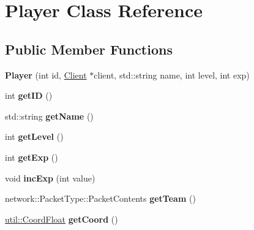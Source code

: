\hypertarget{class_player}{\section{Player Class Reference}
\label{class_player}
}
\subsection*{Public Member Functions}
\begin{DoxyCompactItemize}
\item 
\hypertarget{class_player_aa4859027be34e4fa0f8c05b6be3c22e3}{{\bfseries Player} (int id, \hyperlink{class_client}{Client} $\ast$client, std\-::string name, int level, int exp)}\label{class_player_aa4859027be34e4fa0f8c05b6be3c22e3}

\item 
\hypertarget{class_player_aab4c2c78be24a52f5faeb29e4c04e5f5}{int {\bfseries get\-I\-D} ()}\label{class_player_aab4c2c78be24a52f5faeb29e4c04e5f5}

\item 
\hypertarget{class_player_af1aa472885d589516f483e26e786600e}{std\-::string {\bfseries get\-Name} ()}\label{class_player_af1aa472885d589516f483e26e786600e}

\item 
\hypertarget{class_player_a10dad3b41b420fcc88e83370d981d35b}{int {\bfseries get\-Level} ()}\label{class_player_a10dad3b41b420fcc88e83370d981d35b}

\item 
\hypertarget{class_player_adb81d4193787e61fd964543c1234fba6}{int {\bfseries get\-Exp} ()}\label{class_player_adb81d4193787e61fd964543c1234fba6}

\item 
\hypertarget{class_player_a8bbc7a52991de5e561ff51b77fc26c2f}{void {\bfseries inc\-Exp} (int value)}\label{class_player_a8bbc7a52991de5e561ff51b77fc26c2f}

\item 
\hypertarget{class_player_adeecff9c72be7a3a60af19878cb5e4e8}{network\-::\-Packet\-Type\-::\-Packet\-Contents {\bfseries get\-Team} ()}\label{class_player_adeecff9c72be7a3a60af19878cb5e4e8}

\item 
\hypertarget{class_player_a03fa002bb1981917e81356486b9102aa}{\hyperlink{classutil_1_1_coordinates}{util\-::\-Coord\-Float} {\bfseries get\-Coord} ()}\label{class_player_a03fa002bb1981917e81356486b9102aa}


\end{DoxyCompactItemize}

